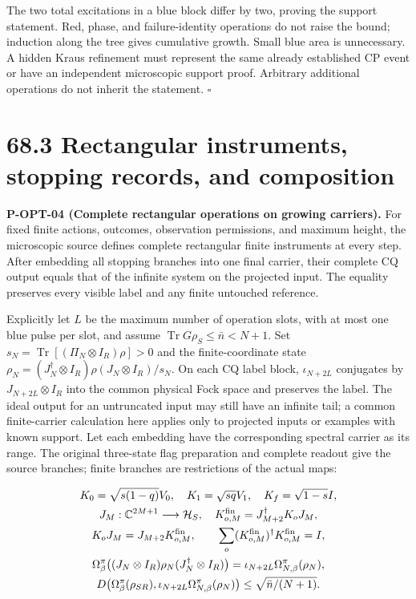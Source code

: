 \documentclass[
  11pt,
  oneside]{book}
\begin{document}
The two total excitations in a blue block differ by two, proving the
support statement. Red, phase, and failure-identity operations do not
raise the bound; induction along the tree gives cumulative growth. Small
blue area is unnecessary. A hidden Kraus refinement must represent the
same already established CP event or have an independent microscopic
support proof. Arbitrary additional operations do not inherit the
statement. \(\square\)

\section{68.3 Rectangular instruments, stopping records, and
composition}

\label{p-opt-04}{}

\textbf{P-OPT-04 (Complete rectangular operations on growing carriers).}
For fixed finite actions, outcomes, observation permissions, and maximum
height, the microscopic source defines complete rectangular finite
instruments at every step. After embedding all stopping branches into
one final carrier, their complete CQ output equals that of the infinite
system on the projected input. The equality preserves every visible
label and any finite untouched reference.

Explicitly let \(L\) be the maximum number of operation slots, with at
most one blue pulse per slot, and assume
\(\operatorname{Tr}G\rho_S\le\bar n<N+1\). Set
\(s_N=\operatorname{Tr}[(\Pi_N\otimes I_R)\rho]>0\) and the
finite-coordinate state
\(\rho_N=(J_N^\dagger\otimes I_R)\rho(J_N\otimes I_R)/s_N\). On each CQ
label block, \(\iota_{N+2L}\) conjugates by \(J_{N+2L}\otimes I_R\) into
the common physical Fock space and preserves the label. The ideal output
for an untruncated input may still have an infinite tail; a common
finite-carrier calculation here applies only to projected inputs or
examples with known support. Let each embedding have the corresponding
spectral carrier as its range. The original three-state flag preparation
and complete readout give the source branches; finite branches are
restrictions of the actual maps:

\[
\begin{gathered}
K_0=\sqrt{s(1-q)}V_0,\quad K_1=\sqrt{sq}V_1,\quad K_f=\sqrt{1-s}I,\\
J_M:\mathbb C^{2M+1}\longrightarrow\mathcal H_S,\quad
K_{o,M}^{\rm fin}=J_{M+2}^\dagger K_oJ_M,\\
K_oJ_M=J_{M+2}K_{o,M}^{\rm fin},\qquad
\sum_o(K_{o,M}^{\rm fin})^\dagger K_{o,M}^{\rm fin}=I,\\
\Omega_\beta^\pi\bigl((J_N\otimes I_R)\rho_N(J_N^\dagger\otimes I_R)\bigr)
=\iota_{N+2L}\Omega_{N,\beta}^\pi(\rho_N),\\
D\bigl(\Omega_\beta^\pi(\rho_{SR}),
\iota_{N+2L}\Omega_{N,\beta}^\pi(\rho_N)\bigr)
\le\sqrt{\bar n/(N+1)}.
\end{gathered}
\]
\end{document}
